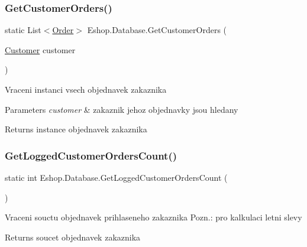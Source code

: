 \subsubsection{\texorpdfstring{GetCustomerOrders()}{GetCustomerOrders()}}
{\footnotesize\ttfamily static List$<$\mbox{\hyperlink{class_eshop_1_1_order}{Order}}$>$ Eshop.\+Database.\+Get\+Customer\+Orders (\begin{DoxyParamCaption}\item[{\mbox{\hyperlink{class_eshop_1_1_customer}{Customer}}}]{customer }\end{DoxyParamCaption})\hspace{0.3cm}{\ttfamily [static]}}



Vraceni instanci vsech objednavek zakaznika 


\begin{DoxyParams}{Parameters}
{\em customer} & zakaznik jehoz objednavky jsou hledany\\
\hline
\end{DoxyParams}
\begin{DoxyReturn}{Returns}
instance objednavek zakaznika
\end{DoxyReturn}
\mbox{\label{class_eshop_1_1_database_aabc0c3c9814f08e1547d9f5203027537}} 
\subsubsection{\texorpdfstring{GetLoggedCustomerOrdersCount()}{GetLoggedCustomerOrdersCount()}}
{\footnotesize\ttfamily static int Eshop.\+Database.\+Get\+Logged\+Customer\+Orders\+Count (\begin{DoxyParamCaption}{ }\end{DoxyParamCaption})\hspace{0.3cm}{\ttfamily [static]}}



Vraceni souctu objednavek prihlaseneho zakaznika Pozn.\+: pro kalkulaci letni slevy 

\begin{DoxyReturn}{Returns}
soucet objednavek zakaznika
\end{DoxyReturn}
\mbox{\label{class_eshop_1_1_database_a6339b833e02a6898bd488e1562b6475e}} 
